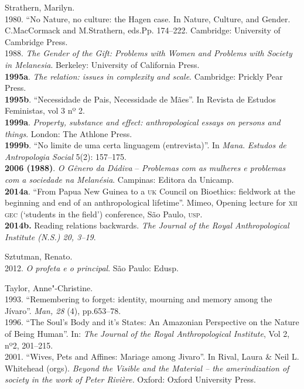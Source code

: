 \begin{bibliohedra}
Strathern, Marilyn.\\
1980. ``No Nature, no culture: the Hagen case. In Nature,
Culture, and Gender. C.MacCormack and M.Strathern, eds.Pp. 174--222.
Cambridge: University of Cambridge Press.\\
1988. \emph{The Gender of the Gift: Problems with Women and
Problems with Society in Melanesia}. Berkeley: University of California
Press.\\
\textbf{1995a}. \emph{The relation: issues in complexity and scale}.
Cambridge: Prickly Pear Press.\\
\textbf{1995b}. ``Necessidade de Pais, Necessidade de Mães''. In Revista
de Estudos Feministas, vol 3 nº 2.\\
\textbf{1999a}. \emph{Property, substance and effect: anthropological
essays on persons and things}. London: The Athlone Press.\\
\textbf{1999b}. ``No limite de uma certa linguagem (entrevista)''. In
\emph{Mana}. \emph{Estudos de Antropologia Social} 5(2): 157--175.\\
\textbf{2006 (1988)}. \emph{O Gênero da Dádiva} -- \emph{Problemas com as
mulheres e problemas com a sociedade na Melanésia}. Campinas: Editora da
Unicamp.\\
\textbf{2014a}. ``From Papua New Guinea to a \textsc{uk} Council on Bioethics:
fieldwork at the beginning and end of an anthropological lifetime''.
Mimeo, Opening lecture for \textsc{xii} \textsc{gec} (`students in the field') conference,
São Paulo, \textsc{usp}.\\
\textbf{2014b.} Reading relations backwards. \emph{The Journal of the
Royal Anthropological Institute (N.S.) 20, 3--19}.

Sztutman, Renato.\\
2012. \emph{O profeta e o principal}. São Paulo: Edusp.

Taylor, Anne"-Christine.\\
1993. ``Remembering to forget: identity, mourning and memory
among the Jívaro''. \emph{Man, 28} (4), pp.653--78.\\
1996. ``The Soul's Body and it's States: An Amazonian
Perspective on the Nature of Being Human''. In: \emph{The} \emph{Journal}
\emph{of the Royal Anthropological Institute}, Vol 2, nº2, 201--215.\\
2001. ``Wives, Pets and Affines: Mariage among Jivaro''. In
Rival, Laura \& Neil L. Whitehead (orgs). \emph{Beyond the Visible and
the Material -- the amerindization of society in the work of Peter
Rivière.} Oxford: Oxford University Press.


\end{bibliohedra}

